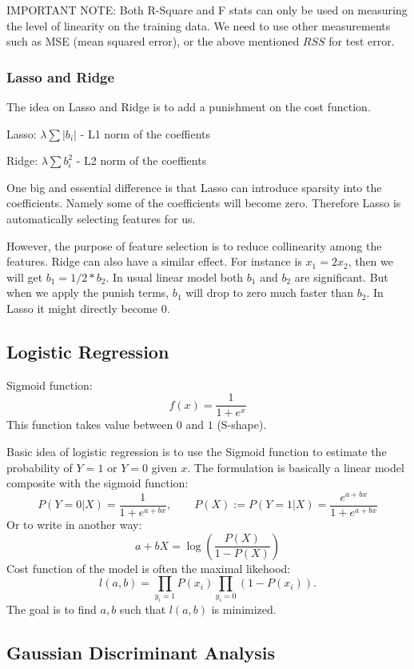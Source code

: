 \documentclass[12pt]{amsart}
\numberwithin{equation}{section}
\theoremstyle{plain}
\theoremstyle{definition}
\begin{document}
IMPORTANT NOTE: Both R-Square and F stats can only be used on measuring the level of linearity on the training data. We need to use other measurements such as MSE (mean squared error), or the above mentioned $RSS$ for test error.

\subsubsection{Lasso and Ridge}
The idea on Lasso and Ridge is to add a punishment on the cost function. 

Lasso: $\lambda\sum |b_i|$ - L1 norm of the coeffients

Ridge: $\lambda\sum b_i^2$ - L2 norm of the coeffients

One big and essential difference is that Lasso can introduce sparsity into the coefficients. Namely some of the coefficients will become zero. Therefore Lasso is automatically selecting features for us. 

However, the purpose of feature selection is to reduce collinearity among the features. Ridge can also have a similar effect. For instance is $x_1 = 2x_2$, then we will get $b_1 = 1/2*b_2$. In usual linear model both $b_1$ and $b_2$ are significant. But when we apply the punish terms, $b_1$ will drop to zero much faster than $b_2$. In Lasso it might directly become 0.

\subsection{Logistic Regression}

Sigmoid function: $$f(x)=\frac{1}{1+e^x}$$ This function takes value between $0$ and $1$ (S-shape).

Basic idea of logistic regression is to use the Sigmoid function to estimate the probability of $Y=1$ or $Y=0$ given $x$. The formulation is basically a linear model composite with the sigmoid function:
$$
P(Y=0|X)=\frac{1}{1+e^{a+bx}},\qquad P(X):=P(Y=1|X)=\frac{e^{a+bx}}{1+e^{a+bx}}
$$
Or to write in another way:
$$
a+bX = \log(\frac{P(X)}{1-P(X)})
$$
Cost function of the model is often the maximal likehood:
$$
l(a,b)=\prod_{y_i=1}P(x_i)\prod_{y_i=0}(1-P(x_i)).
$$
The goal is to find $a, b$ such that $l(a,b)$ is minimized.

\subsection{Gaussian Discriminant Analysis}
\end{document}
